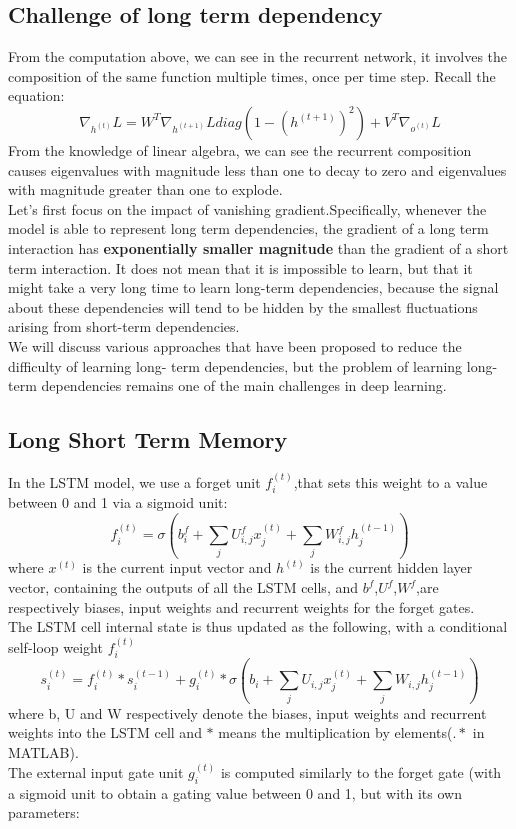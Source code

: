 \subsection{Challenge of long term dependency}
From the computation above, we can see in the recurrent network, it involves the composition of the same function multiple times, once per time step. Recall the equation:
\begin{equation}
\nabla_{h^{(t)}}L = W^T\nabla_{h^{(t+1)}}L diag(1 - (h^{(t+1)})^2) + V^T\nabla_{o^{(t)}}L
\end{equation}
From the knowledge of linear algebra, we can see the recurrent composition causes eigenvalues with magnitude less than one to decay to zero and eigenvalues with magnitude greater than one to explode.  \\
Let's first focus on the impact of vanishing gradient.Specifically, whenever the model is able to represent long term dependencies, the gradient of a long term interaction has \textbf{exponentially smaller magnitude} than
the gradient of a short term interaction. It does not mean that it is impossible to learn, but that it might take a very long time to learn long-term dependencies, because the signal about these dependencies will tend to be hidden by the smallest fluctuations arising from short-term dependencies. \\
We will discuss various approaches that have been proposed to reduce the difficulty of learning long- term dependencies, but the problem of learning long-term dependencies remains one of the main challenges in deep learning.

\subsection{Long Short Term Memory}
In the LSTM model, we use a forget unit $f_i^{(t)}$,that sets this weight to a value between 0 and 1 via a sigmoid unit:
\begin{equation}
f_i^{(t)} = \sigma(b_i^f + \sum_jU_{i,j}^fx_j^{(t)} + \sum_jW_{i,j}^fh_j^{(t-1)})
\end{equation}
where $x^{(t)}$ is the current input vector and $h^{(t)}$ is the current hidden layer vector, containing the outputs of all the LSTM cells, and $b^f$,$U^f$,$W^f$,are respectively biases, input weights and recurrent weights for the forget gates. \\
 The LSTM cell internal state is thus updated as the following, with a conditional self-loop weight $f_i^{(t)}$
\begin{equation}
s_i^{(t)} = f_i^{(t)} \ast s_i^{(t-1)} + g_i^{(t)} \ast \sigma(b_i + \sum_jU_{i,j}x_j^{(t)} + \sum_jW_{i,j}h_j^{(t-1)})
\end{equation}
where b, U and W respectively denote the biases, input weights and recurrent weights into the LSTM cell and $\ast$ means the multiplication by elements($.\ast$ in MATLAB). \\
The external input gate unit $g_i^{(t)}$ is computed similarly to the forget gate (with a sigmoid unit to obtain a gating value between 0 and 1, but with its own parameters:

